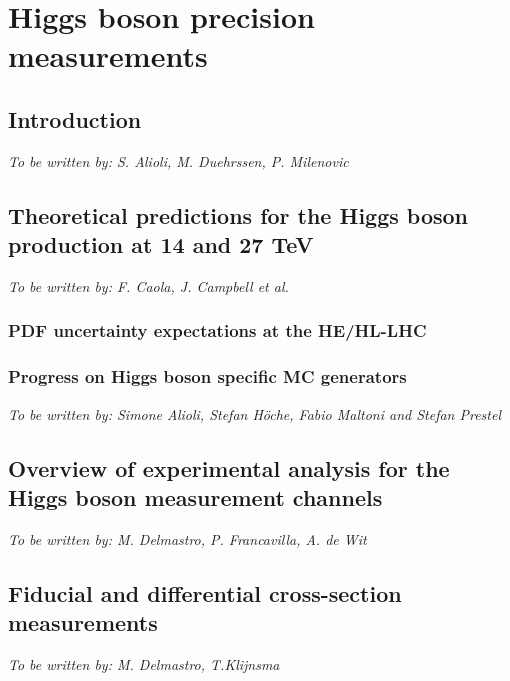 \documentclass[../report.tex]{subfiles}
\providecommand{\main}{..}
\begin{document}
\section{Higgs boson precision measurements}

\subsection{Introduction}
\begin{center}{\it To be written by: S. Alioli, M. Duehrssen, P. Milenovic} \end{center}

\subsection{Theoretical predictions for the Higgs boson production at 14 and 27 TeV}
\begin{center}{\it To be written by: F. Caola, J. Campbell et al.} \end{center}

\label{sec:2_HXSWG1}

\subsubsection{PDF uncertainty expectations at the HE/HL-LHC}


\subsubsection{Progress on Higgs boson specific MC generators}
\begin{center} {\it To be written by: Simone Alioli, Stefan H\"oche, Fabio Maltoni and Stefan Prestel} \end{center}


\subsection{Overview of experimental analysis for the Higgs boson measurement channels}
\begin{center}{\it To be written by: M. Delmastro, P. Francavilla, A. de Wit} \end{center}


\subsection{Fiducial and differential cross-section measurements}
\begin{center}{\it To be written by: M. Delmastro, T.Klijnsma} \end{center}

\end{document}
